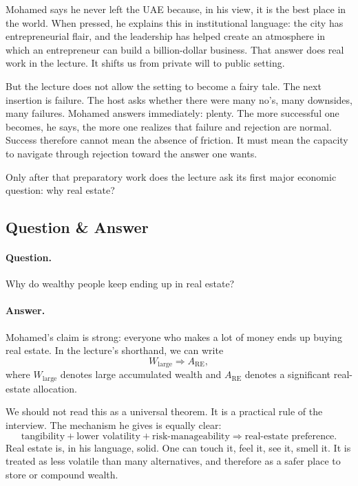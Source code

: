 Mohamed says he never left the UAE because, in his view, it is the best place in the world. When pressed, he explains this in institutional language: the city has entrepreneurial flair, and the leadership has helped create an atmosphere in which an entrepreneur can build a billion-dollar business. That answer does real work in the lecture. It shifts us from private will to public setting.

But the lecture does not allow the setting to become a fairy tale. The next insertion is failure. The host asks whether there were many no's, many downsides, many failures. Mohamed answers immediately: plenty. The more successful one becomes, he says, the more one realizes that failure and rejection are normal. Success therefore cannot mean the absence of friction. It must mean the capacity to navigate through rejection toward the answer one wants.

Only after that preparatory work does the lecture ask its first major economic question: why real estate?

\subsection{Question \& Answer}

\paragraph{Question.} Why do wealthy people keep ending up in real estate?

\paragraph{Answer.} Mohamed's claim is strong: everyone who makes a lot of money ends up buying real estate. In the lecture's shorthand, we can write
\begin{equation}
W_{\text{large}} \Longrightarrow A_{\text{RE}},
\end{equation}
where \(W_{\text{large}}\) denotes large accumulated wealth and \(A_{\text{RE}}\) denotes a significant real-estate allocation.

We should not read this as a universal theorem. It is a practical rule of the interview. The mechanism he gives is equally clear:
\begin{equation}
\text{tangibility} + \text{lower volatility} + \text{risk-manageability}
\Longrightarrow
\text{real-estate preference}.
\end{equation}
Real estate is, in his language, solid. One can touch it, feel it, see it, smell it. It is treated as less volatile than many alternatives, and therefore as a safer place to store or compound wealth.

